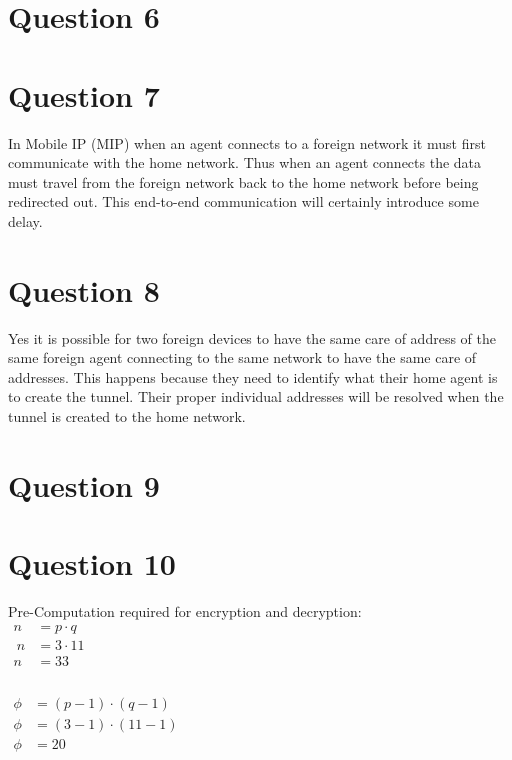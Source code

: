 \documentclass[fleqn, 12pt]{article}
\begin{document}
\section*{Question 6}

\section*{Question 7}

In Mobile IP (MIP) when an agent connects to a foreign network it must first communicate with the home network. Thus when an agent connects the data must travel from the foreign network back to the home network before being redirected out. This end-to-end communication will certainly introduce some delay.

\section*{Question 8}

Yes it is possible for two foreign devices to have the same care of address of the same foreign agent connecting to the same network to have the same care of addresses. This happens because they need to identify what their home agent is to create the tunnel. Their proper individual addresses will be resolved when the tunnel is created to the home network.

\section*{Question 9}

\section*{Question 10}

Pre-Computation required for encryption and decryption:\\

$
    \begin{aligned}
        n &= p \cdot q\\\
        n &= 3 \cdot 11\\
        n &= 33\\
    \end{aligned}
$\\\\

$
    \begin{aligned}
        \phi &= (p-1) \cdot (q-1)\\
        \phi &= (3-1) \cdot (11-1)\\
        \phi &= 20\\
    \end{aligned}
$\\\\
\end{document}
